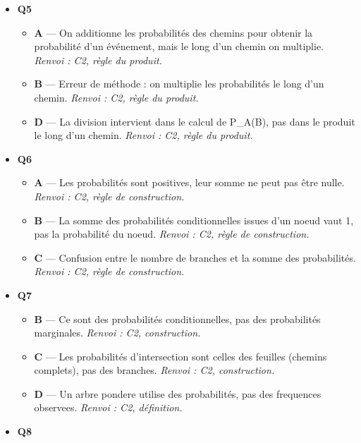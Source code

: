 \begin{itemize}
\begin{itemize}
    \item \textbf{C} — La relation P\_A(B) + P\_A(Bbar) = 1 est toujours vraie, donc on peut conclure. \emph{Renvoi : C1, propriété.}
    \item \textbf{D} — Confusion avec l'incompatibilite. \emph{Renvoi : C1, complementaire.}
  \end{itemize}
  \item \textbf{Q5}
  \begin{itemize}
    \item \textbf{A} — On additionne les probabilités des chemins pour obtenir la probabilité d'un événement, mais le long d'un chemin on multiplie. \emph{Renvoi : C2, règle du produit.}
    \item \textbf{B} — Erreur de méthode : on multiplie les probabilités le long d'un chemin. \emph{Renvoi : C2, règle du produit.}
    \item \textbf{D} — La division intervient dans le calcul de P\_A(B), pas dans le produit le long d'un chemin. \emph{Renvoi : C2, règle du produit.}
  \end{itemize}
  \item \textbf{Q6}
  \begin{itemize}
    \item \textbf{A} — Les probabilités sont positives, leur somme ne peut pas être nulle. \emph{Renvoi : C2, règle de construction.}
    \item \textbf{B} — La somme des probabilités conditionnelles issues d'un noeud vaut 1, pas la probabilité du noeud. \emph{Renvoi : C2, règle de construction.}
    \item \textbf{C} — Confusion entre le nombre de branches et la somme des probabilités. \emph{Renvoi : C2, règle de construction.}
  \end{itemize}
  \item \textbf{Q7}
  \begin{itemize}
    \item \textbf{B} — Ce sont des probabilités conditionnelles, pas des probabilités marginales. \emph{Renvoi : C2, construction.}
    \item \textbf{C} — Les probabilités d'intersection sont celles des feuilles (chemins complets), pas des branches. \emph{Renvoi : C2, construction.}
    \item \textbf{D} — Un arbre pondere utilise des probabilités, pas des frequences observees. \emph{Renvoi : C2, définition.}
  \end{itemize}
  \item \textbf{Q8}

\end{itemize}
